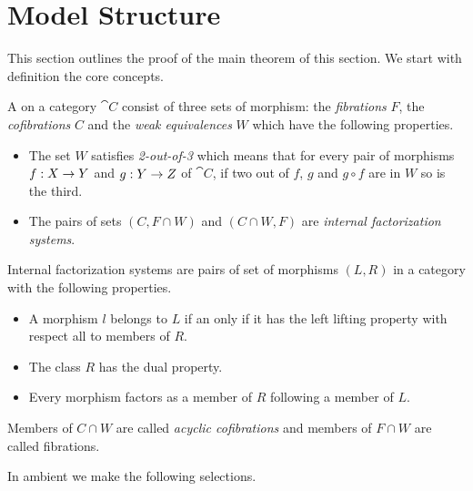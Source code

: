 \documentclass[csh.tex]{subfiles}
\begin{document}
\section{Model Structure}
This section outlines the proof of the main theorem of this section. We start with definition the core concepts.

\begin{definition} A  on a category $\cat C$ consist of three sets of morphism: the \emph{fibrations} $F$, the \emph{cofibrations} $C$ and the \emph{weak equivalences} $W$ which have the following properties. 
\begin{itemize}
\item The set $W$ satisfies \emph{2-out-of-3} which means that for every pair of morphisms $f: X\to Y$ and $g: Y\to Z$ of $\cat C$, if two out of $f$, $g$ and $g\circ f$ are in $W$ so is the third. 
\item The pairs of sets $(C,F\cap W)$ and $(C\cap W,F)$ are \emph{internal factorization systems}. 
\end{itemize}

Internal factorization systems are pairs of set of morphisms $(L,R)$ in a category with the following properties.
\begin{itemize}
\item A morphism $l$ belongs to $L$ if an only if it has the left lifting property with respect all to members of $R$.
\item The class $R$ has the dual property.
\item Every morphism factors as a member of $R$ following a member of $L$.
\end{itemize}

Members of $C\cap W$ are called \emph{acyclic cofibrations} and members of $F\cap W$ are called fibrations.
\end{definition}

In ambient we make the following selections. 
\end{document}
